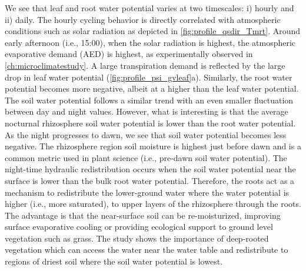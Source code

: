 We see that leaf and root water potential varies at two timescales: i) hourly and ii) daily. The hourly cycling behavior is directly correlated with atmospheric conditions such as solar radiation as depicted in \cref{fig:profile_qsdir_Tmrt}. Around early afternoon (i.e., 15:00), when the solar radiation is highest, the atmospheric evaporative demand (AED) is highest, as experimentally observed in \cref{ch:microclimatestudy}. A large transpiration demand is reflected by the large drop in leaf water potential (\cref{fig:profile_psi_gvleaf}a). Similarly, the root water potential becomes more negative, albeit at a higher than the leaf water potential. The soil water potential follows a similar trend with an even smaller fluctuation between day and night values. However, what is interesting is that the average nocturnal rhizosphere soil water potential is lower than the root water potential. As the night progresses to dawn, we see that soil water potential becomes less negative.  The rhizosphere region soil moisture is highest just before dawn and is a common metric used in plant science (i.e., pre-dawn soil water potential). The night-time hydraulic redistribution occurs when the soil water potential near the surface is lower than the bulk root water potential. Therefore, the roots act as a mechanism to redistribute the lower-ground water where the water potential is higher (i.e., more saturated), to upper layers of the rhizosphere through the roots. The advantage is that the near-surface soil can be re-moisturized, improving surface evaporative cooling or providing ecological support to ground level vegetation such as grass. The study shows the importance of deep-rooted vegetation which can access the water near the water table and redistribute to regions of driest soil where the soil water potential is lowest.

